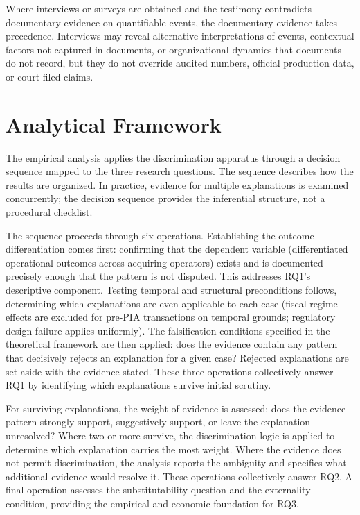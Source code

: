\documentclass[twoside,fontset=lmodern]{mitthesis}
\begin{document}
Where interviews or surveys are obtained and the testimony contradicts
documentary evidence on quantifiable events, the documentary evidence
takes precedence. Interviews may reveal alternative interpretations of
events, contextual factors not captured in documents, or organizational
dynamics that documents do not record, but they do not override audited
numbers, official production data, or court-filed claims.

\hypertarget{analytical-framework}{%
\section{Analytical Framework}\label{analytical-framework}}

The empirical analysis applies the discrimination apparatus through a
decision sequence mapped to the three research questions. The sequence
describes how the results are organized. In practice, evidence for
multiple explanations is examined concurrently; the decision sequence
provides the inferential structure, not a procedural checklist.

The sequence proceeds through six operations. Establishing the outcome
differentiation comes first: confirming that the dependent variable
(differentiated operational outcomes across acquiring operators) exists
and is documented precisely enough that the pattern is not disputed.
This addresses RQ1's descriptive component. Testing temporal and
structural preconditions follows, determining which explanations are
even applicable to each case (fiscal regime effects are excluded for
pre-PIA transactions on temporal grounds; regulatory design failure
applies uniformly). The falsification conditions specified in the
theoretical framework are then applied: does the evidence contain any
pattern that decisively rejects an explanation for a given case?
Rejected explanations are set aside with the evidence stated. These
three operations collectively answer RQ1 by identifying which
explanations survive initial scrutiny.

For surviving explanations, the weight of evidence is assessed: does the
evidence pattern strongly support, suggestively support, or leave the
explanation unresolved? Where two or more survive, the discrimination
logic is applied to determine which explanation carries the most weight.
Where the evidence does not permit discrimination, the analysis reports
the ambiguity and specifies what additional evidence would resolve it.
These operations collectively answer RQ2. A final operation assesses the
substitutability question and the externality condition, providing the
empirical and economic foundation for RQ3.
\end{document}
